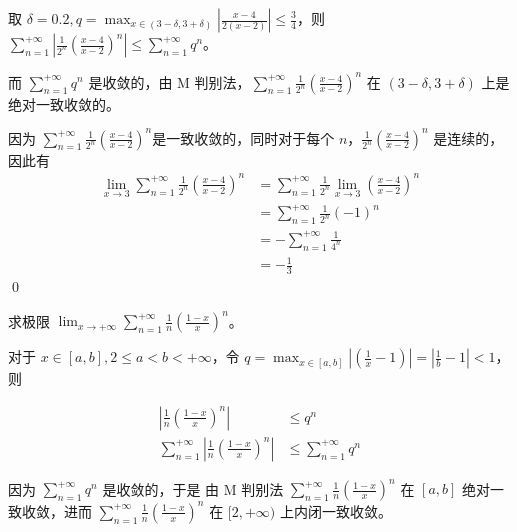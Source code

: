 取 $\displaystyle \delta =0.2,q=\max_{x\in ( 3-\delta ,3+\delta )}\left| \frac{x-4}{2( x-2)}\right| \leqslant \frac{3}{4}$，则 $\displaystyle \sum _{n=1}^{+\infty }\left| \frac{1}{2^{n}}\left(\frac{x-4}{x-2}\right)^{n}\right| \leqslant \sum _{n=1}^{+\infty } q^{n}$。

而 $\displaystyle \sum _{n=1}^{+\infty } q^{n}$ 是收敛的，由 M 判别法，$\displaystyle \sum _{n=1}^{+\infty }\frac{1}{2^{n}}\left(\frac{x-4}{x-2}\right)^{n}$ 在 $\displaystyle ( 3-\delta ,3+\delta )$ 上是绝对一致收敛的。

因为 $\displaystyle \sum _{n=1}^{+\infty }\frac{1}{2^{n}}\left(\frac{x-4}{x-2}\right)^{n}$是一致收敛的，同时对于每个 $\displaystyle n$，$\displaystyle \frac{1}{2^{n}}\left(\frac{x-4}{x-2}\right)^{n}$ 是连续的，因此有
\begin{align*}
	\lim _{x\rightarrow 3}\sum _{n=1}^{+\infty }\frac{1}{2^{n}}\left(\frac{x-4}{x-2}\right)^{n} & =\sum _{n=1}^{+\infty }\frac{1}{2^{n}}\lim _{x\rightarrow 3}\left(\frac{x-4}{x-2}\right)^{n}\\
	& =\sum _{n=1}^{+\infty }\frac{1}{2^{n}}( -1)^{n}\\
	& =-\sum _{n=1}^{+\infty }\frac{1}{4^{n}}\\
	& =-\frac{1}{3}
\end{align*}
\qed 





\begin{ques}
	求极限 $\displaystyle \lim _{x\rightarrow +\infty }\sum _{n=1}^{+\infty }\frac{1}{n}\left(\frac{1-x}{x}\right)^{n}$。
\end{ques}



对于 $\displaystyle x\in [ a,b] ,2\leqslant a< b< +\infty $，令 $\displaystyle q=\max_{x\in [ a,b]}\left| \left(\frac{1}{x} -1\right)\right| =\left| \frac{1}{b} -1\right| < 1$，则


\begin{align*}
	\left| \frac{1}{n}\left(\frac{1-x}{x}\right)^{n}\right|  & \leqslant q^{n}\\
	\sum _{n=1}^{+\infty }\left| \frac{1}{n}\left(\frac{1-x}{x}\right)^{n}\right|  & \leqslant \sum _{n=1}^{+\infty } q^{n}
\end{align*}


因为 $\displaystyle \sum _{n=1}^{+\infty } q^{n}$ 是收敛的，于是 由 M 判别法 $\displaystyle \sum _{n=1}^{+\infty }\frac{1}{n}\left(\frac{1-x}{x}\right)^{n}$ 在 $\displaystyle [ a,b]$ 绝对一致收敛，进而 $\displaystyle \sum _{n=1}^{+\infty }\frac{1}{n}\left(\frac{1-x}{x}\right)^{n}$ 在 $\displaystyle [ 2,+\infty )$ 上内闭一致收敛。

